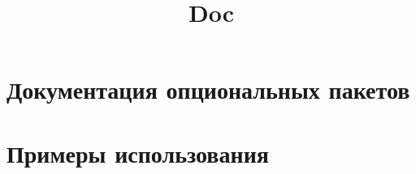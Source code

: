 \documentclass{../stvuz_khpi}
\title{Doc}%
\begin{document}



\tableofcontents
\newpage
\pagestyle{myheadings}

\section{Документация опциональных пакетов}





\section{Примеры использования}

\end{document}
